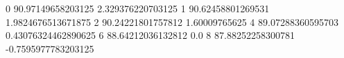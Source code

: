0 90.97149658203125 2.329376220703125
1 90.62458801269531 1.9824676513671875
2 90.24221801757812 1.60009765625
4 89.07288360595703 0.43076324462890625
6 88.64212036132812 0.0
8 87.88252258300781 -0.7595977783203125
